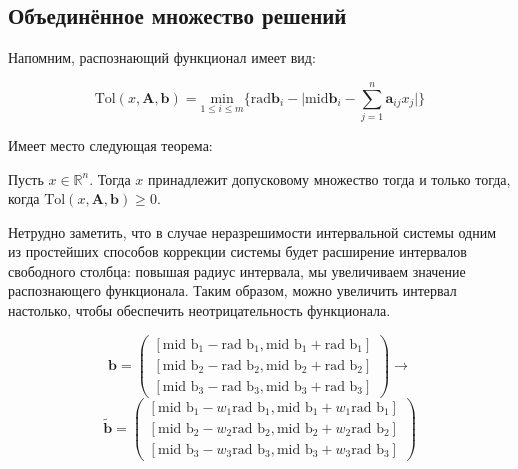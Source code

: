 \subsection{Объединённое множество решений}

Напомним, распознающий функционал имеет вид:

\begin{equation}
\textrm{Tol}(x, \mathbf{A}, \mathbf{b}) = \underset{1 \leq i \leq m}{\textrm{min}} \bigg \lbrace \textrm{rad} \mathbf{b}_i - \bigg| \textrm{mid} \mathbf{b}_i - \sum_{j=1}^{n} \mathbf{a}_{ij}x_j \bigg|  \bigg \rbrace
\end{equation}

Имеет место следующая теорема:

\begin{theorem}
	Пусть $x \in \mathbb{R}^n$. Тогда $x$ принадлежит допусковому множество тогда и только тогда, когда $\textrm{Tol}(x, \mathbf{A}, \mathbf{b}) \geq 0$.
\end{theorem}

Нетрудно заметить, что в случае неразрешимости интервальной системы одним из простейших способов коррекции системы будет расширение интервалов свободного столбца: повышая радиус интервала, мы увеличиваем значение распознающего функционала. Таким образом, можно увеличить интервал настолько, чтобы обеспечить неотрицательность функционала.

\begin{equation*}
\mathbf{b}=
\begin{pmatrix}
[\textrm{mid b}_1 - \textrm{rad b}_1, \textrm{mid b}_1 + \textrm{rad b}_1] \\
[\textrm{mid b}_2 - \textrm{rad b}_2, \textrm{mid b}_2 + \textrm{rad b}_2] \\
[\textrm{mid b}_3 - \textrm{rad b}_3, \textrm{mid b}_3 + \textrm{rad b}_3]
\end{pmatrix}
\rightarrow
\end{equation*}
\begin{equation*}
\tilde{\mathbf{b}}=
\begin{pmatrix}
[\textrm{mid b}_1 - w_1 \textrm{rad b}_1, \textrm{mid b}_1 + w_1 \textrm{rad b}_1] \\
[\textrm{mid b}_2 - w_2 \textrm{rad b}_2, \textrm{mid b}_2 + w_2 \textrm{rad b}_2] \\
[\textrm{mid b}_3 - w_3 \textrm{rad b}_3, \textrm{mid b}_3 + w_3 \textrm{rad b}_3]
\end{pmatrix}
\end{equation*}

